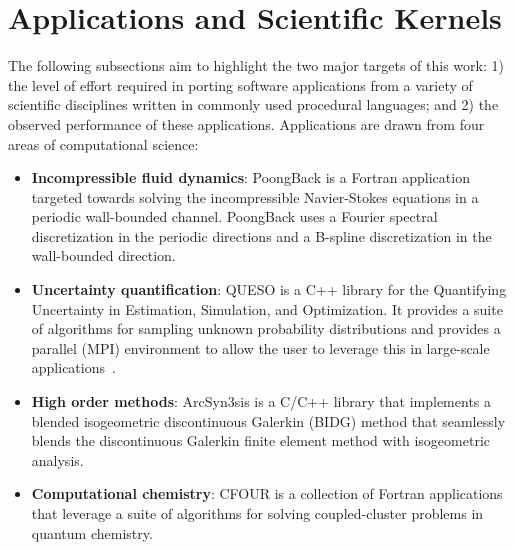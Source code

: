 \section{Applications and Scientific Kernels}
\label{sec:apps}

The following subsections aim to highlight the two major targets of this work: 1) the level of effort
required in porting software applications from a variety of scientific
disciplines written in commonly used procedural languages; and 2) the observed
performance of these applications.  Applications are drawn from four areas
of computational science:
\begin{itemize}
\item {\bf Incompressible fluid dynamics}:  PoongBack is a Fortran application
targeted towards solving the incompressible Navier-Stokes equations in a
periodic wall-bounded channel.  PoongBack uses a Fourier spectral
discretization in the periodic directions and a B-spline discretization in the
wall-bounded direction.

\item {\bf Uncertainty quantification}:  QUESO is a C++ library for the
Quantifying Uncertainty in Estimation, Simulation, and Optimization.  It
provides a suite of algorithms for sampling unknown probability distributions
and provides a parallel (MPI) environment to allow the user to leverage this in
large-scale applications~\cite{Prudencio:2012ft,McDougall:2015bc,EstacioHiroms:2016wd}.

\item {\bf High order methods}:  ArcSyn3sis is a C/C++ library that implements
a blended isogeometric discontinuous Galerkin (BIDG) method that seamlessly
blends the discontinuous Galerkin finite element method with isogeometric analysis.

\item {\bf Computational chemistry}:  CFOUR is a collection of Fortran
applications that leverage a suite of algorithms for solving coupled-cluster
problems in quantum chemistry.

\end{itemize}

%
